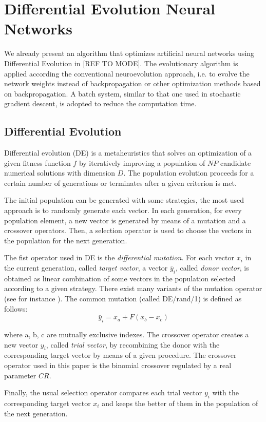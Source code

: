 \section{Differential Evolution Neural Networks}
We already present an algorithm that optimizes artificial neural networks using Differential Evolution in [REF TO MODE]. 
The evolutionary algorithm is applied according the conventional neuroevolution approach, i.e. to evolve the network weights instead of backpropagation or other optimization methods based on backpropagation. A batch system, similar to that one used in stochastic
gradient descent, is adopted to reduce the computation time.

\subsection{Differential Evolution}
Differential evolution (DE) is a metaheuristics that solves an optimization of a given fitness function $f$ by iteratively improving a population of $NP$ candidate numerical solutions with dimension $D$.
The population evolution proceeds for a certain number of generations or terminates after a given criterion is met.

The initial population can be generated with some strategies, the most used approach is to randomly generate each vector.
In each generation, for every population element, a new vector is generated by means of a mutation and a crossover operators.
Then, a selection operator is used to choose the vectors in the population for the next generation. 

The fist operator used in DE is the {\it differential mutation}. For each vector $x_i$ in the current generation, called {\it target vector}, a vector $\bar y_i$, called {\it donor vector}, is obtained as linear combination of some vectors in the population selected according
to a given strategy.
There exist many variants of the mutation operator (see for instance \cite{surveyDE_2011,surveyDE_2016}). 
The common mutation (called DE/rand/1) is defined as follows:
$$\bar y_i = x_a + F(x_b - x_c)$$

where a, b, c are mutually exclusive indexes.
The crossover operator creates a new vector $y_i$, called {\it trial vector}, by recombining the donor with the corresponding target vector by means of a given procedure. The crossover operator used in this paper is the binomial crossover regulated by a real parameter $CR$.

Finally, the usual selection operator compares each trial vector $y_i$ with the corresponding target vector $x_i$ and keeps the better of them in the population of the next generation.

